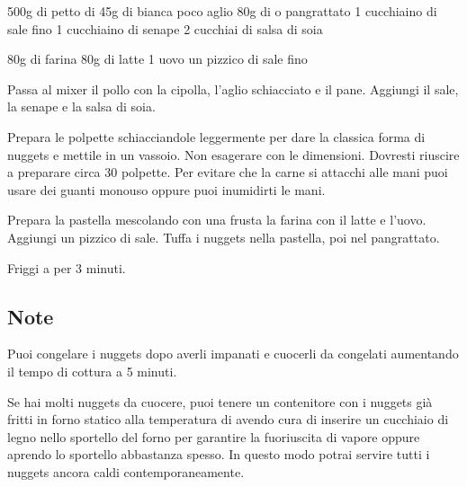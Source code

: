 \begin{ingreds}
	500g di petto di 
	45g di  bianca
	poco aglio
	80g di  o pangrattato
	1 cucchiaino di sale fino
	1 cucchiaino di senape
	2 cucchiai di salsa di soia

\columnbreak
{}
	80g di farina
	80g di latte
	1 uovo
	un pizzico di sale fino
\end{ingreds}

\begin{method}
Passa al mixer il pollo con la cipolla, l'aglio schiacciato e il pane. Aggiungi il sale, la senape e la salsa di soia.

Prepara le polpette schiacciandole leggermente per dare la classica forma di nuggets e mettile in un vassoio. Non esagerare con le dimensioni. Dovresti riuscire a preparare circa 30 polpette. Per evitare che la carne si attacchi alle mani puoi usare dei guanti monouso oppure puoi inumidirti le mani.

Prepara la pastella mescolando con una frusta la farina con il latte e l'uovo. Aggiungi un pizzico di sale. Tuffa i nuggets nella pastella, poi nel pangrattato.

Friggi a  per 3 minuti.

\end {method}

\subsection*{Note}
		Puoi congelare i nuggets dopo averli impanati e cuocerli da congelati aumentando il tempo di cottura a 5 minuti.

		Se hai molti nuggets da cuocere, puoi tenere un contenitore con i nuggets già fritti in forno statico alla temperatura di  avendo cura di inserire un cucchiaio di legno nello sportello del forno per garantire la fuoriuscita di vapore oppure aprendo lo sportello abbastanza spesso. In questo modo potrai servire tutti i nuggets ancora caldi contemporaneamente.


